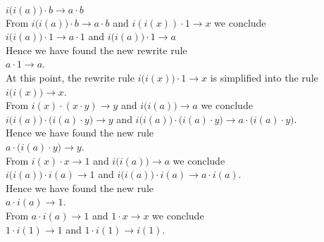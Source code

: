 \\[0.2cm]
\hspace*{1.3cm}
$i\bigl(i(a)\bigr) \cdot b \rightarrow a \cdot b$
\\[0.2cm]
From $i\bigl(i(a)\bigr) \cdot b \rightarrow a \cdot b$ and $i(i(x)) \cdot 1 \rightarrow x$ we conclude
\\[0.2cm]
\hspace*{1.3cm}
$i\bigl(i(a)\bigr) \cdot 1 \rightarrow a \cdot 1$ \quad and \quad
$i\bigl(i(a)\bigr) \cdot 1 \rightarrow a$
\\[0.2cm]
Hence we have found the new rewrite rule
\\[0.2cm]
\hspace*{1.3cm}
$a \cdot 1 \rightarrow a$.
\\[0.2cm]
At this point, the rewrite rule $i\bigl(i(x)\bigr) \cdot 1 \rightarrow x$ is simplified into the rule
\\[0.2cm]
\hspace*{1.3cm}
$i\bigl(i(x)\bigr) \rightarrow x$.
\\[0.2cm]
From $i(x) \cdot (x \cdot y) \rightarrow y$ and $i\bigl(i(a)\bigr) \rightarrow a$ we conclude
\\[0.2cm]
\hspace*{1.3cm}
$i\bigl(i(a)\bigr) \cdot \bigl(i(a)\cdot y\bigr) \rightarrow y$ \quad and \quad
$i\bigl(i(a)\bigr) \cdot \bigl(i(a)\cdot y\bigr) \rightarrow a \cdot \bigl(i(a) \cdot y\bigr)$.
\\[0.2cm]
Hence we have found the new rule
\\[0.2cm]
\hspace*{1.3cm}
$a \cdot \bigl(i(a) \cdot y\bigr) \rightarrow y$.
\\[0.2cm]
From $i(x) \cdot x \rightarrow 1$ and $i\bigl(i(a)\bigr) \rightarrow a$ we conclude
\\[0.2cm]
\hspace*{1.3cm}
$i\bigl(i(a)\bigr) \cdot i(a) \rightarrow 1$ \quad and \quad
$i\bigl(i(a)\bigr) \cdot i(a) \rightarrow a \cdot i(a)$.
\\[0.2cm]
Hence we have found the new rule
\\[0.2cm]
\hspace*{1.3cm}
$a \cdot i(a) \rightarrow 1$.
\\[0.2cm]
From $a \cdot i(a) \rightarrow 1$ and $1 \cdot x \rightarrow x$ we conclude
\\[0.2cm]
\hspace*{1.3cm}
$1 \cdot i(1) \rightarrow 1$ \quad and \quad $1 \cdot i(1) \rightarrow i(1)$.
\\[0.2cm]
